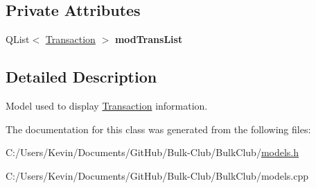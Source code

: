 \subsection*{Private Attributes}
\begin{DoxyCompactItemize}
\item 
\mbox{\label{class_transaction_model_aa995e7324ce9315c8fea821825068053}} 
Q\+List$<$ \mbox{\hyperlink{class_transaction}{Transaction}} $>$ {\bfseries mod\+Trans\+List}
\end{DoxyCompactItemize}


\subsection{Detailed Description}
Model used to display \mbox{\hyperlink{class_transaction}{Transaction}} information. 

The documentation for this class was generated from the following files\+:\begin{DoxyCompactItemize}
\item 
C\+:/\+Users/\+Kevin/\+Documents/\+Git\+Hub/\+Bulk-\/\+Club/\+Bulk\+Club/\mbox{\hyperlink{models_8h}{models.\+h}}\item 
C\+:/\+Users/\+Kevin/\+Documents/\+Git\+Hub/\+Bulk-\/\+Club/\+Bulk\+Club/models.\+cpp\end{DoxyCompactItemize}
